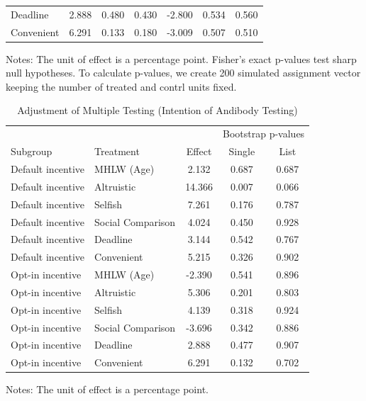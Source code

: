 \documentclass[
    a4paper
]{article}
\begin{document}
\begin{table}
\begin{threeparttable}
\begin{tabular}[t]{lcccccc}
\hspace{1em}Deadline & 2.888 & 0.480 & 0.430 & -2.800 & 0.534 & 0.560\\
\hspace{1em}Convenient & 6.291 & 0.133 & 0.180 & -3.009 & 0.507 & 0.510\\
\bottomrule
\end{tabular}
\begin{tablenotes}
\item Notes: The unit of effect is a percentage point. Fisher's exact p-values test sharp null hypotheses. To calculate p-values, we create 200 simulated assignment vector keeping the number of treated and contrl units fixed.
\end{tablenotes}
\end{threeparttable}
\end{table}

\begin{table}

\caption{\label{tab:multiple-adjust-test-int}Adjustment of Multiple Testing (Intention of Andibody Testing)}
\centering
\fontsize{9}{11}\selectfont
\begin{threeparttable}
\begin{tabular}[t]{llccc}
\toprule
\multicolumn{3}{c}{ } & \multicolumn{2}{c}{Bootstrap p-values} \\
\cmidrule(l{3pt}r{3pt}){4-5}
Subgroup & Treatment & Effect & Single & List\\
\midrule
Default incentive & MHLW (Age) & 2.132 & 0.687 & 0.687\\
Default incentive & Altruistic & 14.366 & 0.007 & 0.066\\
Default incentive & Selfish & 7.261 & 0.176 & 0.787\\
Default incentive & Social Comparison & 4.024 & 0.450 & 0.928\\
Default incentive & Deadline & 3.144 & 0.542 & 0.767\\
Default incentive & Convenient & 5.215 & 0.326 & 0.902\\
Opt-in incentive & MHLW (Age) & -2.390 & 0.541 & 0.896\\
Opt-in incentive & Altruistic & 5.306 & 0.201 & 0.803\\
Opt-in incentive & Selfish & 4.139 & 0.318 & 0.924\\
Opt-in incentive & Social Comparison & -3.696 & 0.342 & 0.886\\
Opt-in incentive & Deadline & 2.888 & 0.477 & 0.907\\
Opt-in incentive & Convenient & 6.291 & 0.132 & 0.702\\
\bottomrule
\end{tabular}
\begin{tablenotes}
\item Notes: The unit of effect is a percentage point.
\end{tablenotes}
\end{threeparttable}
\end{table}
\end{document}
